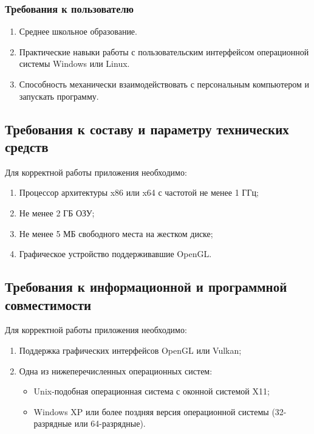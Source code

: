 \documentclass[a4paper,12pt,reqno]{article}
\begin{document}
  \subsubsection{Требования к пользователю}
  \begin{enumerate}
    \item Среднее школьное образование.
    \item Практические навыки работы с пользовательским интерфейсом операционной системы Windows или Linux.
    \item Способность механически взаимодействовать с персональным компьютером и запускать программу.
  \end{enumerate}

  \subsection{Требования к составу и параметру технических средств}
  Для корректной работы приложения необходимо:
  \begin{enumerate}
    \item Процессор архитектуры x86 или x64 с частотой не менее 1 ГГц;
    \item Не менее 2 ГБ ОЗУ;
    \item Не менее 5 МБ свободного места на жестком диске;
    \item Графическое устройство поддерживавшие OpenGL.
  \end{enumerate}

  \subsection{Требования к информационной и программной совместимости}
  Для корректной работы приложения необходимо:
  \begin{enumerate}
    \item Поддержка графических интерфейсов OpenGL или Vulkan;
    \item Одна из нижеперечисленных операционных систем:
    \begin{itemize}
      \item Unix-подобная операционная система с оконной системой X11;
      \item Windows XP или более поздняя версия операционной системы (32-разрядные или 64-разрядные).
    \end{itemize}
  \end{enumerate}

\end{document}
